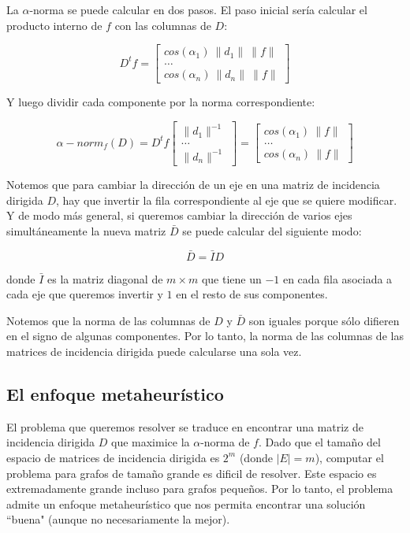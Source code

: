 \documentclass[conference,compsoc,a4paper]{IEEEtran}
\begin{document}
\smallskip

La $\alpha$-norma se puede calcular en dos pasos. El paso inicial sería 
calcular el producto interno de $f$ con las columnas de $D$:

$$
D^t f = \begin{bmatrix}
	cos(\alpha_1) \ \|d_1\| \ \|f\|\\
	\dots \\
	cos(\alpha_n) \ \|d_n\| \ \|f\|
\end{bmatrix}
$$

\smallskip

Y luego dividir cada componente por la norma correspondiente:

$$
\alpha-norm_f(D) = D^t f
\begin{bmatrix}
	\|d_1\|^{-1}\\
	\dots \\
	\|d_n\|^{-1}
\end{bmatrix} = \begin{bmatrix}
	cos(\alpha_1) \ \|f\|\\
	\dots \\
	cos(\alpha_n) \ \|f\|
\end{bmatrix}
$$

\smallskip

Notemos que para cambiar la dirección de un eje en una matriz de 
incidencia dirigida $D$, hay que invertir la fila correspondiente al 
eje que se quiere modificar. Y de modo más general, si queremos cambiar 
la dirección de varios ejes simultáneamente la nueva matriz $\bar{D}$
se puede calcular del siguiente modo:

$$\bar{D} = \bar{I} D$$

\smallskip

donde $\bar{I}$ es la matriz diagonal de $m \times m$ que tiene un $-1$ 
en cada fila asociada a cada eje que queremos invertir y $1$ en el resto 
de sus componentes.

\smallskip

Notemos que la norma de las columnas de $D$ y $\bar{D}$ son iguales 
porque sólo difieren en el signo de algunas componentes. Por lo tanto, 
la norma de las columnas de las matrices de incidencia dirigida puede 
calcularse una sola vez.

\bigskip
\subsection{El enfoque metaheurístico}

El problema que queremos resolver se traduce en encontrar una matriz de 
incidencia dirigida $D$ que maximice la $\alpha$-norma de $f$. 
Dado que el tamaño del espacio de matrices de 
incidencia dirigida es $2^m$  (donde $|E|=m$), computar el problema
para grafos de tamaño grande es dificil de resolver. 
Este espacio es 
extremadamente grande incluso para grafos pequeños. Por lo tanto, el 
problema admite un enfoque metaheurístico que nos permita encontrar 
una solución ``buena" (aunque no necesariamente la mejor).
\end{document}
